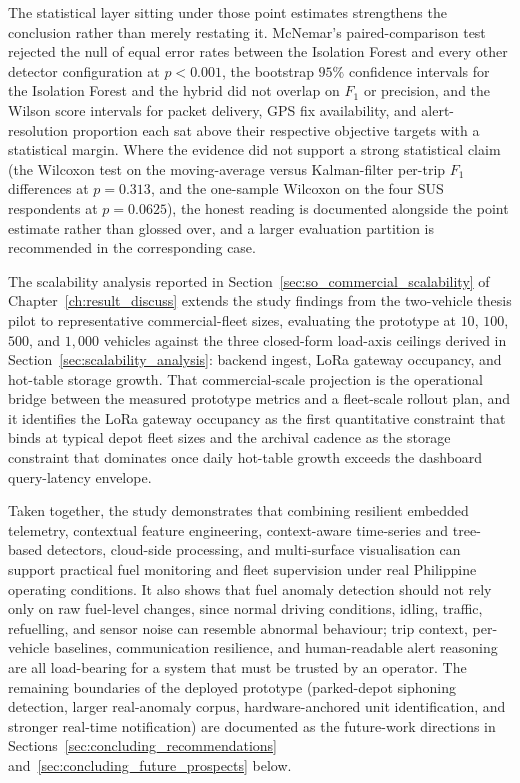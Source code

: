 The statistical layer sitting under those point estimates strengthens the conclusion rather than merely restating it. McNemar's paired-comparison test rejected the null of equal error rates between the Isolation Forest and every other detector configuration at $p < 0.001$, the bootstrap $95\%$ confidence intervals for the Isolation Forest and the hybrid did not overlap on $F_1$ or precision, and the Wilson score intervals for packet delivery, GPS fix availability, and alert-resolution proportion each sat above their respective objective targets with a statistical margin. Where the evidence did not support a strong statistical claim (the Wilcoxon test on the moving-average versus Kalman-filter per-trip $F_1$ differences at $p = 0.313$, and the one-sample Wilcoxon on the four SUS respondents at $p = 0.0625$), the honest reading is documented alongside the point estimate rather than glossed over, and a larger evaluation partition is recommended in the corresponding case.

The scalability analysis reported in Section~\ref{sec:so_commercial_scalability} of Chapter~\ref{ch:result_discuss} extends the study findings from the two-vehicle thesis pilot to representative commercial-fleet sizes, evaluating the prototype at $10$, $100$, $500$, and $1{,}000$ vehicles against the three closed-form load-axis ceilings derived in Section~\ref{sec:scalability_analysis}: backend ingest, LoRa gateway occupancy, and hot-table storage growth. That commercial-scale projection is the operational bridge between the measured prototype metrics and a fleet-scale rollout plan, and it identifies the LoRa gateway occupancy as the first quantitative constraint that binds at typical depot fleet sizes and the archival cadence as the storage constraint that dominates once daily hot-table growth exceeds the dashboard query-latency envelope.

Taken together, the study demonstrates that combining resilient embedded telemetry, contextual feature engineering, context-aware time-series and tree-based detectors, cloud-side processing, and multi-surface visualisation can support practical fuel monitoring and fleet supervision under real Philippine operating conditions. It also shows that fuel anomaly detection should not rely only on raw fuel-level changes, since normal driving conditions, idling, traffic, refuelling, and sensor noise can resemble abnormal behaviour; trip context, per-vehicle baselines, communication resilience, and human-readable alert reasoning are all load-bearing for a system that must be trusted by an operator. The remaining boundaries of the deployed prototype (parked-depot siphoning detection, larger real-anomaly corpus, hardware-anchored unit identification, and stronger real-time notification) are documented as the future-work directions in Sections~\ref{sec:concluding_recommendations} and~\ref{sec:concluding_future_prospects} below.

